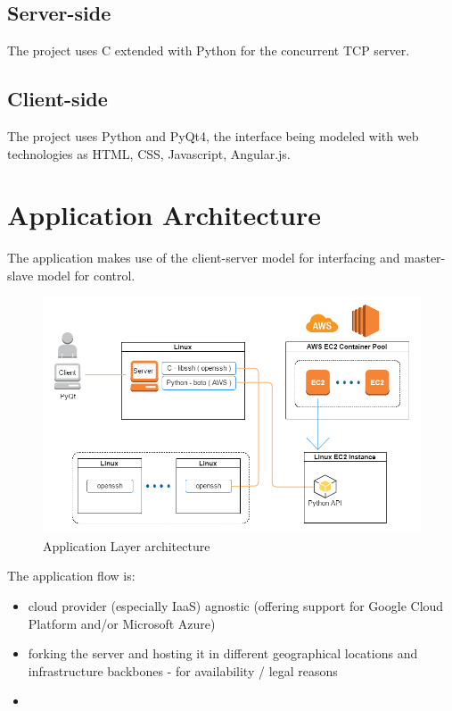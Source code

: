 \documentclass{llncs}
\begin{document}
\subsection{Server-side}

The project uses C extended with Python for the concurrent TCP server. 

\subsection{Client-side}

The project uses Python and PyQt4, the interface being modeled with web technologies as HTML, CSS, Javascript, Angular.js.

%
\section{Application Architecture}
%
The application makes use of the client-server model for interfacing and master-slave model for control.

\begin{figure}[h]
\includegraphics[scale=0.7]{app-layer.png}
\centering
\caption{Application Layer architecture}
\end{figure}

The application flow is:
\begin{itemize}
  \item cloud provider (especially IaaS) agnostic (offering support for Google Cloud Platform and/or Microsoft Azure)
  \item forking the server and hosting it in different geographical locations and infrastructure backbones - for availability / legal reasons
  \item 
\end{itemize}
\end{document}
